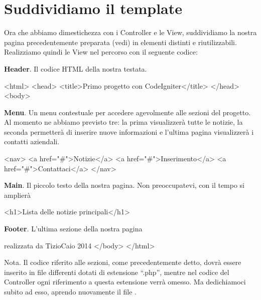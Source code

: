 \section*{Suddividiamo il template}
Ora che abbiamo dimestichezza con i Controller e le View, suddividiamo la nostra pagina precedentemente preparata (vedi) in elementi distinti e riutilizzabili. Realizziamo quindi le View nel percorso  con il seguente codice:

\textbf{Header}. Il codice \ac{HTML} della nostra testata.

\begin{html}
<html>
<head>
<title>Primo progetto con CodeIgniter</title>
</head>
<body>
\end{html}

\textbf{Menu}. Un menu contestuale per accedere agevolmente alle sezioni del progetto. Al momento ne abbiamo previsto tre: la prima visualizzerà tutte le notizie, la seconda permetterà di inserire nuove informazioni e l'ultima pagina visualizzerà i contatti aziendali.

\begin{html}
<nav>
	<a href="#">Notizie</a>
	<a href="#">Inserimento</a>
	<a href="#">Contattaci</a>
</nav>
\end{html}

\textbf{Main}. Il piccolo testo della nostra pagina. Non preoccupatevi, con il tempo si amplierà

\begin{html}
<h1>Lista delle notizie principali</h1>
\end{html}

\textbf{Footer}. L'ultima sezione della nostra pagina

\begin{code}
realizzata da TizioCaio 2014
</body>
</html>
\end{code}

Nota. Il codice riferito alle sezioni, come precedentemente detto, dovrà essere inserito in file differenti dotati di estensione ``.php'', mentre nel codice del Controller ogni riferimento a questa estensione verrà omesso. Ma dedichiamoci subito ad esso, aprendo nuovamente il file .


